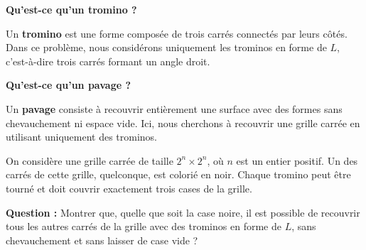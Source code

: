 \textbf{Qu'est-ce qu'un tromino ?}

Un \textbf{tromino} est une forme composée de trois carrés connectés par
leurs côtés. Dans ce problème, nous considérons uniquement les trominos en
forme de $L$, c'est-à-dire trois carrés formant un angle droit.

\textbf{Qu'est-ce qu'un pavage ?}

Un \textbf{pavage} consiste à recouvrir entièrement une surface avec des
formes sans chevauchement ni espace vide. Ici, nous cherchons à recouvrir une
grille carrée en utilisant uniquement des trominos.

On considère une grille carrée de taille $2^n \times 2^n$, où $n$ est un
entier positif. Un des carrés de cette grille, quelconque, est colorié en noir. Chaque tromino
peut être tourné et doit couvrir exactement trois cases de la grille.

\textbf{Question :} Montrer que, quelle que soit la case noire, il est possible de recouvrir tous les autres carrés de la
grille avec des trominos en forme de $L$, sans chevauchement et sans laisser
de case vide ?
